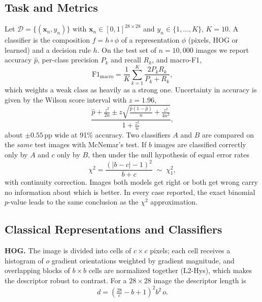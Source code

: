 \documentclass[conference]{IEEEtran}
\newcommand{\pp}{\,pp}                       %
\begin{document}
\subsection{Task and Metrics}
Let $\mathcal{D}=\{(\mathbf{x}_n,y_n)\}$ with $\mathbf{x}_n\in[0,1]^{28\times28}$ and $y_n\in\{1,\dots,K\}$, $K=10$.
A classifier is the composition $f=h\circ\phi$ of a representation $\phi$ (pixels, HOG or learned) and a decision rule
$h$. On the test set of $n=10{,}000$ images we report accuracy $\hat p$, per-class precision $P_k$ and recall $R_k$, and
macro-F1,
\begin{equation}
  \mathrm{F1}_{\text{macro}} = \frac{1}{K}\sum_{k=1}^{K}\frac{2P_kR_k}{P_k+R_k},
  \label{eq:f1}
\end{equation}
which weights a weak class as heavily as a strong one. Uncertainty in accuracy is given by the Wilson score
interval with $z=1.96$,
\begin{equation}
  \frac{\hat p+\frac{z^2}{2n}\pm z\sqrt{\frac{\hat p(1-\hat p)}{n}+\frac{z^2}{4n^2}}}{1+\frac{z^2}{n}},
  \label{eq:wilson}
\end{equation}
about $\pm0.55$\pp{} wide at 91\% accuracy. Two classifiers $A$ and $B$ are compared on the \emph{same} test images with
McNemar's test. If $b$ images are classified correctly only by $A$ and
$c$ only by $B$, then under the null hypothesis of equal error rates
\begin{equation}
  \chi^2=\frac{(|b-c|-1)^2}{b+c}\;\sim\;\chi^2_1 ,
  \label{eq:mcnemar}
\end{equation}
with continuity correction. Images both models get right or both get wrong carry no information about which is
better. In every case reported, the exact binomial $p$-value leads to the same conclusion as the $\chi^2$
approximation.

\subsection{Classical Representations and Classifiers}
\textbf{HOG.} The image is divided into cells of $c\times c$ pixels; each cell receives a histogram of $o$ gradient
orientations weighted by gradient magnitude, and overlapping blocks of $b\times b$ cells are normalized together
(L2-Hys), which makes the descriptor robust to contrast. For a $28\times28$ image the descriptor length is
\begin{equation}
  d = \left(\tfrac{28}{c}-b+1\right)^{2} b^{2}\, o .
  \label{eq:hogdim}
\end{equation}
\end{document}
